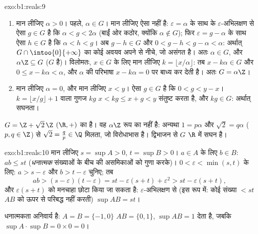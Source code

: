 \begin{solution}{exo:b1:reals:9}
\begin{enumerate}
  \item मान लीजिए $\alpha > 0$। पहले, $\alpha \in G$। मान लीजिए ऐसा नहीं है:
  $\varepsilon = \alpha$ के साथ  के $\varepsilon$-अभिलक्षण से ऐसा $g
  \in G$ है कि $\alpha < g < 2\alpha$ (बाईं ओर कठोर, क्योंकि $\alpha \notin
  G$); फिर $\varepsilon = g - \alpha$ के साथ ऐसा $h \in G$ है कि $\alpha < h
  < g$। अब $g - h \in G$ और $0 < g - h < g - \alpha < \alpha$: अर्थात् $G
  \cap \intoo{0}{+\infty}$ का कोई अवयव अपने  से नीचे, जो असंगत है।
  अतः $\alpha \in G$, और $\alpha\Z \subseteq G$ ($G$  है)। विलोमतः, $x
  \in G$ के लिए मान लीजिए $k = \lfloor x/\alpha \rfloor$: तब $x - k\alpha
  \in G$ और $0 \leq x - k\alpha < \alpha$, और $\alpha$ की परिभाषा $x -
  k\alpha = 0$ पर बाध्य कर देती है। अतः $G = \alpha\Z$।
  \item मान लीजिए $\alpha = 0$, और मान लीजिए $x < y$। ऐसा $g \in G$ है कि $0
  < g < y - x$। $k = \lfloor x/g \rfloor + 1$ वाला गुणज $kg$ $x < kg \leq x
  + g < y$ संतुष्ट करता है, और $kg \in G$: अर्थात् सघनता।
\end{enumerate}
$G = \Z + \sqrt 2\,\Z$ $(\R, +)$ का  है। वह $\alpha\Z$ रूप का नहीं है:
अन्यथा $1 = p\alpha$ और $\sqrt 2 = q\alpha$ ($p, q \in \Z$) से $\sqrt 2 =
\frac qp \in \Q$ मिलता, जो विरोधाभास है। द्विभाजन से $G$ $\R$ में सघन है।
\end{solution}

\begin{solution}{exo:b1:reals:10}
मान लीजिए $s = \sup A > 0$, $t = \sup B > 0$। $a \in A$ के लिए $b \in B$:
$ab \leq st$ (\emph{धनात्मक} संख्याओं के बीच की असमिकाओं को गुणा करके)। $0 <
\varepsilon < \min(s, t)$ के लिए: $a > s - \varepsilon$ और $b > t -
\varepsilon$ चुनिए; तब
\[
ab > (s - \varepsilon)(t - \varepsilon)
= st - \varepsilon(s + t) + \varepsilon^2
> st - \varepsilon (s + t),
\]
और $\varepsilon(s+t)$ को मनचाहा छोटा किया जा सकता है: $\varepsilon$-अभिलक्षण
से (इस रूप में: कोई संख्या $< st$ $AB$ को ऊपर से परिबद्ध नहीं करती) $\sup AB
= st$।

धनात्मकता अनिवार्य है: $A = B = \{-1, 0\}$ $AB = \{0, 1\}$, $\sup AB = 1$
देता है, जबकि $\sup A \cdot \sup B = 0 \times 0 = 0$।
\end{solution}

